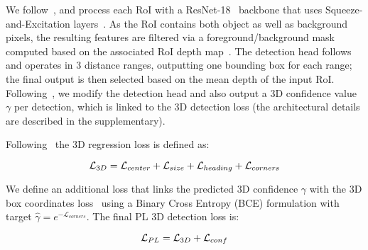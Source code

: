 We follow~\cite{ma2020rethinking}, and process each RoI with a ResNet-18~\cite{he2016deep} backbone that uses Squeeze-and-Excitation layers~\cite{hu2018squeeze}. As the RoI contains both object as well as background pixels, the resulting features are filtered via a foreground/background mask computed based on the associated RoI depth map~\cite{ma2019accurate}. The detection head follows~\cite{ma2020rethinking} and operates in 3 distance ranges, outputting one bounding box for each range; the final output is then selected based on the mean depth of the input RoI. Following~\cite{simonelli2019disentangling,simonelli2020demystifying}, we modify the detection head and also output a 3D confidence value $\gamma$ per detection, which is linked to the 3D detection loss (the architectural details are described in the supplementary).

 Following~\cite{qi2018frustum} the 3D regression loss is defined as:

\begin{equation} \label{eq:3D_bbox_loss}
\small
\mathcal{L}_{3D} = \mathcal{L}_{center} +  \mathcal{L}_{size} +  \mathcal{L}_{heading} +  \mathcal{L}_{corners}
\end{equation}

We define an additional loss that links the predicted 3D confidence $\gamma$ with the 3D box coordinates loss~\cite{simonelli2019disentangling} using a Binary Cross Entropy (BCE) formulation with target $\hat{\gamma}=e^{-\mathcal{L}_{corners}}$. The final PL 3D detection loss is:

\begin{equation} \label{eq:3D_bbox_loss}
\small
\mathcal{L}_{PL} = \mathcal{L}_{3D} +  \mathcal{L}_{conf}
\end{equation}
